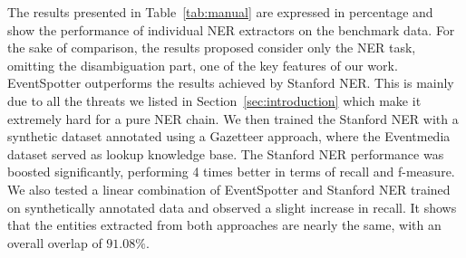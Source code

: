 \documentclass[10pt,a4paper]{article}
\begin{document}
{%
The results presented in Table~\ref{tab:manual} are expressed in percentage and show the performance of individual NER extractors on the benchmark data. For the sake of comparison, the results proposed consider only the NER task, omitting the disambiguation part, one of the key features of our work. EventSpotter outperforms the results achieved by Stanford NER. This is mainly due to all the threats we listed in Section~\ref{sec:introduction} which make it extremely hard for a pure NER chain. We then trained the Stanford NER with a synthetic dataset annotated using a Gazetteer approach, where the Eventmedia dataset served as lookup knowledge base. The Stanford NER performance was boosted significantly, performing 4 times better in terms of recall and f-measure. We also tested a linear combination of EventSpotter and Stanford NER trained on synthetically annotated data and observed a slight increase in recall. It shows that the entities extracted from both approaches are nearly the same, with an overall overlap of $91.08\%$.

}
\end{document}
